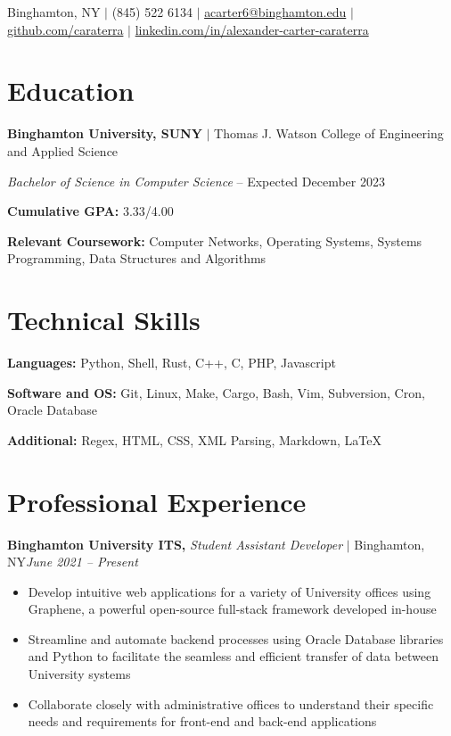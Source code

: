 \documentclass[8pt]{extarticle}
\author{Alexander Carter}
\newcommand{\jobentry}[4]{\textbf{#1,} \textit{#2} \(|\) #3\hfill \textit{#4}}
\renewcommand{\maketitle}{\begin{center}\Huge\theauthor\end{center}\vspace{.5em}}
\begin{document}
\maketitle

\begin{center}
  Binghamton, NY
  \(|\)
  (845) 522 6134
  \(|\)
  \href{mailto://acarter6@binghamton.edu}{acarter6@binghamton.edu}
  \(|\)
  \href{https://github.com/caraterra}{github.com/caraterra}
  \(|\)
  \href{https://www.linkedin.com/in/alexander-carter-caraterra}{linkedin.com/in/alexander-carter-caraterra}
\end{center}

\section{Education}

\textbf{Binghamton University, SUNY} \(|\) Thomas J. Watson College of Engineering and Applied Science

\textit{Bachelor of Science in Computer Science} -- Expected December 2023

\textbf{Cumulative GPA:} 3.33/4.00

\textbf{Relevant Coursework:} Computer Networks, Operating Systems, Systems Programming, Data Structures and Algorithms

\section{Technical Skills}

\textbf{Languages:} Python, Shell, Rust, C++, C, PHP, Javascript

\textbf{Software and OS:} Git, Linux, Make, Cargo, Bash, Vim, Subversion, Cron, Oracle Database

\textbf{Additional:} Regex, HTML, CSS, XML Parsing, Markdown, {\LaTeX}

\section{Professional Experience}

\jobentry{Binghamton University ITS}{Student Assistant Developer}{Binghamton, NY}{June 2021 -- Present}

\begin{itemize}
  \item{Develop intuitive web applications for a variety of University offices using Graphene, a powerful open-source full-stack framework developed in-house}
  \item{Streamline and automate backend processes using Oracle Database libraries and Python to facilitate the seamless and efficient transfer of data between University systems}
  \item{Collaborate closely with administrative offices to understand their specific needs and requirements for front-end and back-end applications}
\end{itemize}
\end{document}
